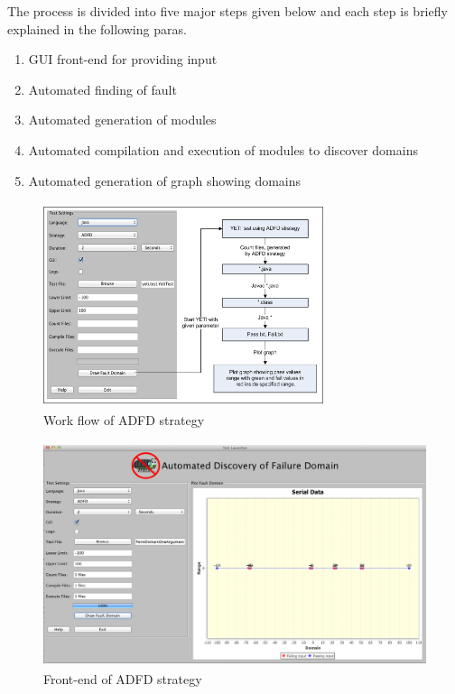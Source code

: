 The process is divided into five major steps given below and each step is briefly explained in the following paras.

\begin{enumerate}
\item GUI front-end for providing input
\item Automated finding of fault
\item Automated generation of modules
\item Automated compilation and execution of modules to discover domains
\item Automated generation of graph showing domains
\end{enumerate}

\begin{figure}[ht]
\centering
\includegraphics[width=8.2cm,height=6cm]{chapter4/ADFD_Diagram1.png}
\caption{Work flow of ADFD strategy}
\label{fig:ADFD-workflow}
\end{figure}

\begin{figure}[htp]
\begin{center}
\includegraphics[width=12cm,height=6.6cm]{chapter4/ADFD_front_end.png}
\caption{Front-end of ADFD strategy}
\label{fig:ADFD-frontend}
\end{center}
\end{figure}

